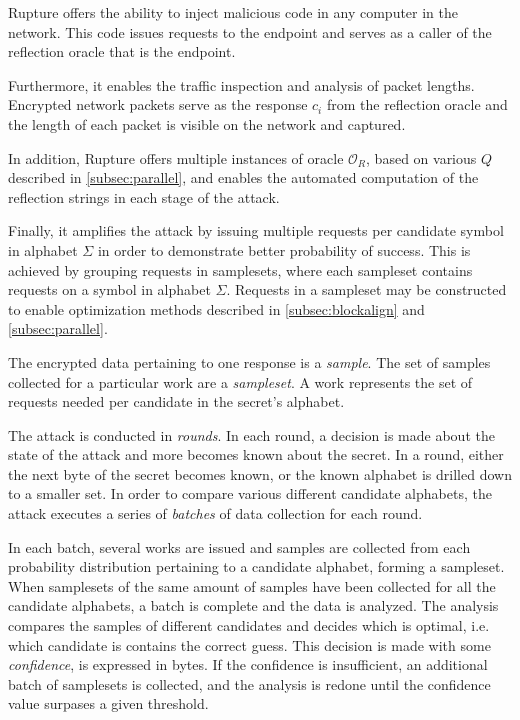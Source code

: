 \documentclass[conference, letterpaper, 10pt]{IEEEtran}
\begin{document}
Rupture offers the ability to inject malicious code in any computer in the
network. This code issues requests to the endpoint and serves as a caller of
the reflection oracle that is the endpoint.

Furthermore, it enables the traffic inspection and analysis of packet
lengths. Encrypted network packets serve as the response $c_i$ from the
reflection oracle and the length of each packet is visible on the network and
captured.

In addition, Rupture offers multiple instances of oracle $\mathcal{O}_R$, based
on various $Q$ described in \ref{subsec:parallel}, and enables the automated
computation of the reflection strings in each stage of the attack.

Finally, it amplifies the attack by issuing multiple requests per candidate
symbol in alphabet $\Sigma$ in order to demonstrate better probability of
success. This is achieved by grouping requests in samplesets, where each
sampleset contains requests on a symbol in alphabet $\Sigma$. Requests in a
sampleset may be constructed to enable optimization methods described in
\ref{subsec:blockalign} and \ref{subsec:parallel}.

The encrypted data pertaining to one response is a \textit{sample}.  The set of
samples collected for a particular work are a \textit{sampleset}. A work
represents the set of requests needed per candidate in the secret's alphabet.

The attack is conducted in \textit{rounds}. In each round, a decision is made
about the state of the attack and more becomes known about the secret. In a
round, either the next byte of the secret becomes known, or the known alphabet
is drilled down to a smaller set. In order to compare various different
candidate alphabets, the attack executes a series of \textit{batches} of data
collection for each round.

In each batch, several works are issued and samples are collected from each probability distribution
pertaining to a candidate alphabet, forming a sampleset. When samplesets of the
same amount of samples have been collected for all the candidate alphabets,
a batch is complete and the data is analyzed. The analysis compares the samples
of different candidates and decides which is optimal, i.e. which candidate is
contains the correct guess. This decision is made with some \textit{confidence},
is expressed in bytes. If the confidence is insufficient, an additional
batch of samplesets is collected, and the analysis is redone until the
confidence value surpases a given threshold.
\end{document}
